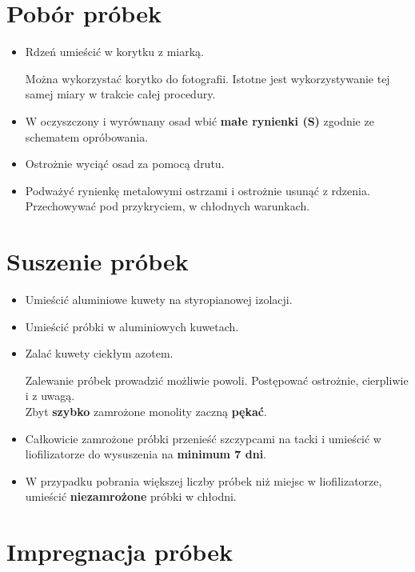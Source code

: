 \documentclass[
  letterpaper,
  DIV=11,
  numbers=noendperiod]{scrreprt}
\begin{document}
\hypertarget{pobuxf3r-pruxf3bek}{%
\section{Pobór próbek}\label{pobuxf3r-pruxf3bek}}

\begin{itemize}
\item
  Rdzeń umieścić w korytku z miarką.

  Można wykorzystać korytko do fotografii. Istotne jest wykorzystywanie
  tej samej miary w trakcie całej procedury.
\item
  W oczyszczony i wyrównany osad wbić \textbf{małe rynienki (S)} zgodnie
  ze schematem opróbowania.
\item
  Ostrożnie wyciąć osad za pomocą drutu.
\item
  Podważyć rynienkę metalowymi ostrzami i ostrożnie usunąć z rdzenia.
  Przechowywać pod przykryciem, w chłodnych warunkach.
\end{itemize}

\hypertarget{suszenie-pruxf3bek}{%
\section{Suszenie próbek}\label{suszenie-pruxf3bek}}

\begin{itemize}
\item
  Umieścić aluminiowe kuwety na styropianowej izolacji.
\item
  Umieścić próbki w aluminiowych kuwetach.
\item
  Zalać kuwety ciekłym azotem.

  Zalewanie próbek prowadzić możliwie powoli. Postępować ostrożnie,
  cierpliwie i z uwagą.\\
  Zbyt \textbf{szybko} zamrożone monolity zaczną \textbf{pękać}.
\item
  Całkowicie zamrożone próbki przenieść szczypcami na tacki i umieścić w
  liofilizatorze do wysuszenia na \textbf{minimum 7 dni}.
\item
  W przypadku pobrania większej liczby próbek niż miejsc w
  liofilizatorze, umieścić \textbf{niezamrożone} próbki w chłodni.
\end{itemize}

\hypertarget{impregnacja-pruxf3bek}{%
\section{Impregnacja próbek}\label{impregnacja-pruxf3bek}}
\end{document}
